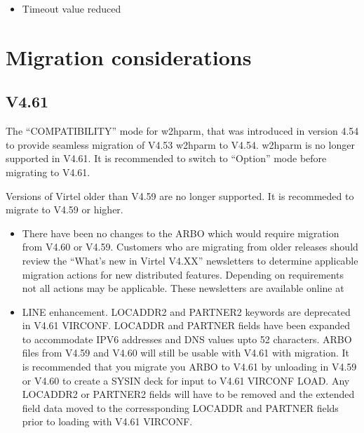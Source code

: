 \documentclass[letterpaper,10pt,english]{sphinxmanual}
\begin{document}
\begin{itemize}
\item {} 
Timeout value reduced

\end{itemize}


\chapter{Migration considerations}
\label{\detokenize{TN202101:migration-considerations}}

\section{V4.61}
\label{\detokenize{TN202101:v4-61}}

The “COMPATIBILITY” mode for w2hparm, that was introduced in version 4.54 to provide seamless migration of V4.53 w2hparm to V4.54. w2hparm is no longer supported in V4.61. It is recommended to switch to “Option” mode before migrating to V4.61.


Versions of Virtel older than V4.59 are no longer supported. It is recommeded to migrate to V4.59 or higher.

\begin{itemize}
\item {} 
There have been no changes to the ARBO which would require migration from V4.60 or V4.59. Customers who are migrating from older releases should review the “What’s new in Virtel V4.XX” newsletters to determine applicable migration actions for new distributed features. Depending on requirements not all actions may be applicable. These newsletters are available online at 

\item {} 
LINE enhancement. LOCADDR2 and PARTNER2 keywords are deprecated in V4.61 VIRCONF. LOCADDR and PARTNER fields have been expanded to accommodate IPV6 addresses and DNS values upto 52 characters. ARBO files from V4.59 and V4.60 will still be usable with V4.61 with migration. It is recommended that you migrate you ARBO to V4.61 by unloading in V4.59 or V4.60 to create a SYSIN deck for input to V4.61 VIRCONF LOAD. Any LOCADDR2 or PARTNER2 fields will have to be removed and the extended field data moved to the corressponding LOCADDR and PARTNER fields prior to loading with V4.61 VIRCONF.

\end{itemize}
\end{document}
